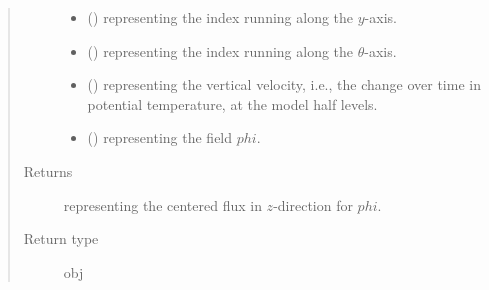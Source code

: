 \documentclass[letterpaper,10pt,english]{sphinxmanual}
\begin{document}
\begin{fulllineitems}
\begin{fulllineitems}
\begin{quote}
\begin{description}
\begin{itemize}
\item {} 
 () \textendash{}  representing the index running along the \(y\)-axis.

\item {} 
 () \textendash{}  representing the index running along the \(\theta\)-axis.

\item {} 
 () \textendash{}  representing the vertical velocity, i.e., the change over time in
potential temperature, at the model half levels.

\item {} 
 () \textendash{}  representing the field \(phi\).

\end{itemize}

\item[{Returns}] \leavevmode
{} representing the centered flux in \(z\)-direction for \(phi\).

\item[{Return type}] \leavevmode
obj

\end{description}\end{quote}

\end{fulllineitems}


\end{fulllineitems}

\end{document}
